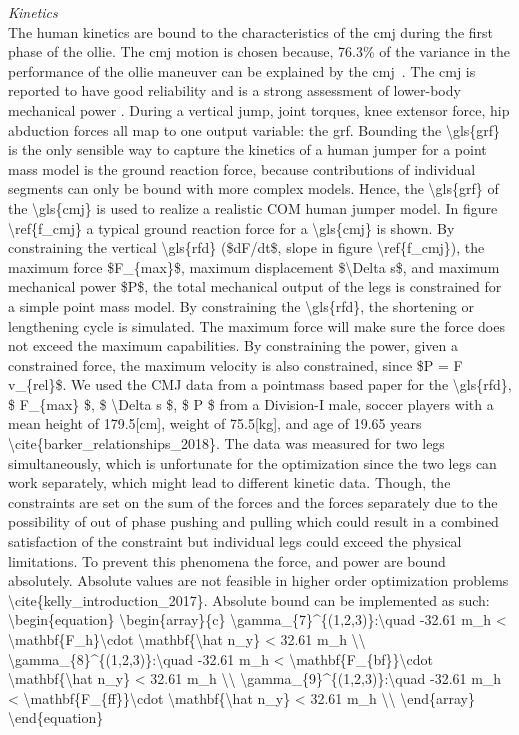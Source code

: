 \documentclass[default,iicol]{sn-jnl}
\begin{document}
\textit{Kinetics} \\
The human kinetics are bound to the characteristics of the \gls{cmj} during the first phase of the ollie. The \gls{cmj} motion is chosen because, 76.3\% of the variance in the performance of the ollie maneuver can be explained by the \gls{cmj}~\cite{candotti_lower_2012}. The \gls{cmj} is reported to have good reliability and is a strong assessment of lower-body mechanical power \cite{barker_relationships_2018}. During a vertical jump, joint torques, knee extensor force, hip abduction forces all map to one output variable: the \gls{grf. Bounding the \gls{grf} is the only sensible way to capture the kinetics of a human jumper for a point mass model is the ground reaction force, because contributions of individual segments can only be bound with more complex models. Hence, the \gls{grf} of the \gls{cmj} is used to realize a realistic COM human jumper model. In figure \ref{f_cmj} a typical ground reaction force for a \gls{cmj} is shown. By constraining the vertical \gls{rfd} ($dF/dt$, slope in figure \ref{f_cmj}), the maximum force $F_{max}$, maximum displacement $\Delta s$, and maximum mechanical power $P$, the total mechanical output of the legs is constrained for a simple point mass model. By constraining the \gls{rfd}, the shortening or lengthening cycle is simulated. The maximum force will make sure the force does not exceed the maximum capabilities. By constraining the power, given a constrained force, the maximum velocity is also constrained, since $P = F v_{rel}$. We used the CMJ data from a pointmass based paper for the \gls{rfd}, $ F_{max} $, $ \Delta s $, $ P $ from a Division-I male, soccer players with a mean height of 179.5[cm], weight of 75.5[kg], and age of 19.65 years \cite{barker_relationships_2018}. The data was measured for two legs simultaneously, which is unfortunate for the optimization since the two legs can work separately, which might lead to different kinetic data. Though, the constraints are set on the sum of the forces and the forces separately due to the possibility of out of phase pushing and pulling which could result in a combined satisfaction of the constraint but individual legs could exceed the physical limitations. To prevent this phenomena the force, and power are bound absolutely. Absolute values are not feasible in higher order optimization problems \cite{kelly_introduction_2017}. Absolute bound can be implemented as such:
\begin{equation}
\begin{array}{c}
    \gamma_{7}^{(1,2,3)}:\quad  -32.61 m_h < \mathbf{F_h}\cdot \mathbf{\hat n_y} < 32.61 m_h   \\
    \gamma_{8}^{(1,2,3)}:\quad  -32.61 m_h < \mathbf{F_{bf}}\cdot \mathbf{\hat n_y} < 32.61 m_h \\
    \gamma_{9}^{(1,2,3)}:\quad  -32.61 m_h < \mathbf{F_{ff}}\cdot \mathbf{\hat n_y} < 32.61 m_h \\
\end{array}
\end{equation}

}
\end{document}
